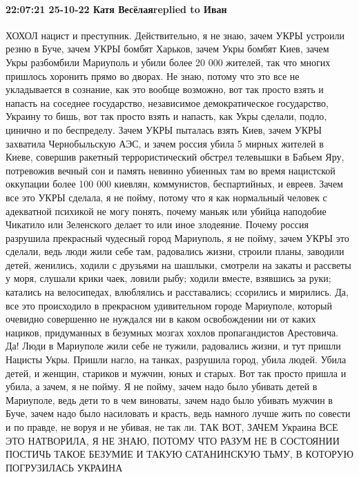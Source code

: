  
 
 
 
 

\paragraph{22:07:21 25-10-22 Катя Весёлаяreplied to Иван}

ХОХОЛ нацист и преступник. Действительно, я не знаю, зачем УКРЫ устроили резню в
Буче, зачем УКРЫ бомбят Харьков, зачем Укры бомбят Киев, зачем Укры разбомбили
Мариуполь и убили более 20 000 жителей, так что многих пришлось хоронить прямо во
дворах. Не знаю, потому что это все не укладывается в сознание, как это вообще
возможно, вот так просто взять и напасть на соседнее государство, независимое
демократическое государство, Украину то бишь, вот так просто взять и напасть, как Укры
сделали, подло, цинично и по беспределу. Зачем УКРЫ пыталась взять Киев,
зачем УКРЫ захватила Чернобыльскую АЭС, и зачем россия убила 5 мирных
жителей в Киеве, совершив ракетный террористический обстрел телевышки в
Бабьем Яру, потревожив вечный сон и память невинно убиенных там во время
нацистской оккупации более 100 000 киевлян, коммунистов, беспартийных, и евреев.
Зачем все это УКРЫ сделала, я не пойму, потому что я как нормальный человек
с адекватной психикой не могу понять, почему маньяк или убийца наподобие
Чикатило или Зеленского делает то или иное злодеяние. Почему россия разрушила
прекрасный чудесный город Мариуполь, я не пойму, зачем УКРЫ это сделали,
ведь люди жили себе там, радовались жизни, строили планы, заводили детей,
женились, ходили с друзьями на шашлыки, смотрели на закаты и рассветы у моря,
слушали крики чаек, ловили рыбу; ходили вместе, взявшись за руки; катались
на велосипедах, влюблялись и расставались; ссорились и мирились. Да, все это
происходило в прекрасном удивительном городе Мариуполе, который очевидно
совершенно не нуждался ни в каком освобождении ни от каких нациков, придуманных в
безумных мозгах хохлов пропагандистов Арестовича. Да!
Люди в Мариуполе жили себе не тужили, радовались жизни, и тут пришли Нацисты Укры.
Пришли нагло, на танках, разрушила город, убила людей. Убила детей, и женщин,
стариков и мужчин, юных и старых. Вот так просто пришла и убила, а зачем, я
не пойму. Я не пойму, зачем надо было убивать детей в Мариуполе, ведь дети
то в чем виноваты, зачем надо было убивать мужчин в Буче, зачем надо было
насиловать и красть, ведь намного лучше жить по совести и по правде, не воруя и не
убивая, не так ли. ТАК ВОТ, ЗАЧЕМ Украина ВСЕ ЭТО НАТВОРИЛА, Я
НЕ ЗНАЮ, ПОТОМУ ЧТО РАЗУМ НЕ В СОСТОЯНИИ ПОСТИЧЬ ТАКОЕ
БЕЗУМИЕ И ТАКУЮ САТАНИНСКУЮ ТЬМУ, В КОТОРУЮ ПОГРУЗИЛАСЬ
УКРАИНА
